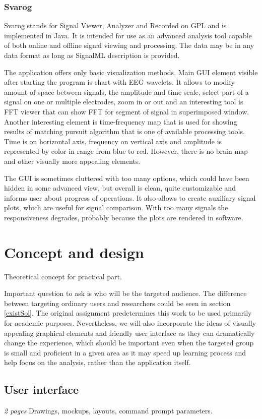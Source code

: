 \subsection{Svarog}
Svarog stands for Signal Viewer, Analyzer and Recorded on GPL and is
implemented in Java. It is intended for use as an advanced analysis tool capable
of both online and offline signal viewing and processing. The data may be in any
data format as long as SignalML description is provided.

The application offers only basic visualization methods. Main GUI element
visible after starting the program is chart with EEG wavelets. It allows to
modify amount of space between signals, the amplitude and time scale, select
part of a signal on one or multiple electrodes, zoom in or out and an
interesting tool is FFT viewer that can show FFT for segment of signal in
superimposed window. Another interesting element is time-frequency map that is
used for showing results of matching pursuit algorithm that is one of available
processing tools. Time is on horizontal axis, frequency on vertical axis and
amplitude is represented by color in range from blue to red. However, there is
no brain map and other visually more appealing elements.

The GUI is sometimes cluttered with too many options, which could have been
hidden in some advanced view, but overall is clean, quite customizable and
informs user about progress of operations. It also allows to create auxiliary
signal plots, which are useful for signal comparison. With too many signals
the responsiveness degrades, probably because the plots are rendered in software.
\chapter{Concept and design} \label{concept}
Theoretical concept for practical part.

Important question to ask is who will be the targeted audience. The difference
between targeting ordinary users and researchers could be seen in section
\ref{existSol}. The original assignment predetermines this work to be used
primarily for academic purposes. Nevertheless, we will also incorporate the
ideas of visually appealing graphical elements and friendly user interface as
they can dramatically change the experience, which should be important even when
the targeted group is small and proficient in a given area as it may speed up
learning process and help focus on the analysis, rather than the application
itself.
\section{User interface}
\emph{2 pages}
Drawings, mockups, layouts, command prompt parameters.

